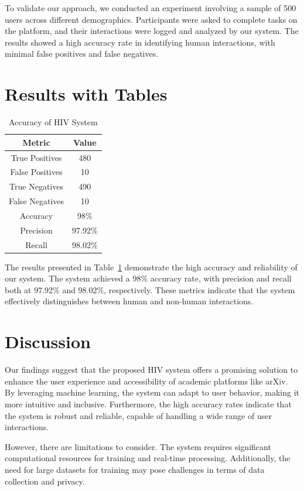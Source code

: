 \documentclass{article}
\begin{document}
To validate our approach, we conducted an experiment involving a sample of 500 users across different demographics. Participants were asked to complete tasks on the platform, and their interactions were logged and analyzed by our system. The results showed a high accuracy rate in identifying human interactions, with minimal false positives and false negatives.

\section{Results with Tables}
\begin{table}[ht]
\centering
\caption{Accuracy of HIV System}
\begin{tabular}{|c|c|}
\hline
\textbf{Metric} & \textbf{Value} \\
\hline
True Positives & 480 \\
False Positives & 10 \\
True Negatives & 490 \\
False Negatives & 10 \\
\hline
Accuracy & 98\% \\
Precision & 97.92\% \\
Recall & 98.02\% \\
\hline
\end{tabular}
\label{tab:results}
\end{table}

The results presented in Table~\ref{tab:results} demonstrate the high accuracy and reliability of our system. The system achieved a 98\% accuracy rate, with precision and recall both at 97.92\% and 98.02\%, respectively. These metrics indicate that the system effectively distinguishes between human and non-human interactions.

\section{Discussion}
Our findings suggest that the proposed HIV system offers a promising solution to enhance the user experience and accessibility of academic platforms like arXiv. By leveraging machine learning, the system can adapt to user behavior, making it more intuitive and inclusive. Furthermore, the high accuracy rates indicate that the system is robust and reliable, capable of handling a wide range of user interactions.

However, there are limitations to consider. The system requires significant computational resources for training and real-time processing. Additionally, the need for large datasets for training may pose challenges in terms of data collection and privacy.
\end{document}

